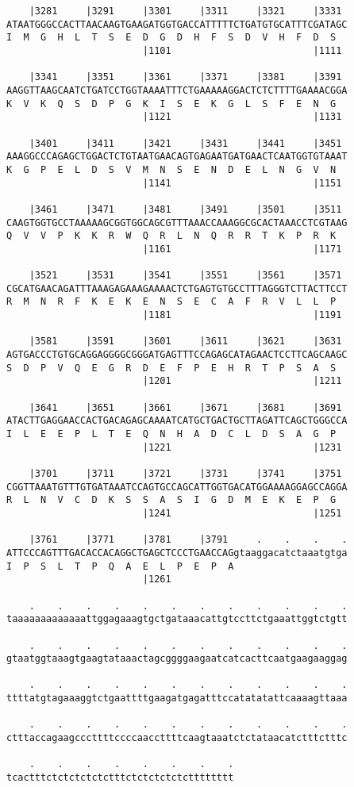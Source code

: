 \documentclass{article}
\begin{document}
\begin{Verbatim}
    |3281     |3291     |3301     |3311     |3321     |3331 
ATAATGGGCCACTTAACAAGTGAAGATGGTGACCATTTTTCTGATGTGCATTTCGATAGC
I  M  G  H  L  T  S  E  D  G  D  H  F  S  D  V  H  F  D  S  
                        |1101                         |1111 
  
    |3341     |3351     |3361     |3371     |3381     |3391 
AAGGTTAAGCAATCTGATCCTGGTAAAATTTCTGAAAAAGGACTCTCTTTTGAAAACGGA
K  V  K  Q  S  D  P  G  K  I  S  E  K  G  L  S  F  E  N  G  
                        |1121                         |1131 
  
    |3401     |3411     |3421     |3431     |3441     |3451 
AAAGGCCCAGAGCTGGACTCTGTAATGAACAGTGAGAATGATGAACTCAATGGTGTAAAT
K  G  P  E  L  D  S  V  M  N  S  E  N  D  E  L  N  G  V  N  
                        |1141                         |1151 
  
    |3461     |3471     |3481     |3491     |3501     |3511 
CAAGTGGTGCCTAAAAAGCGGTGGCAGCGTTTAAACCAAAGGCGCACTAAACCTCGTAAG
Q  V  V  P  K  K  R  W  Q  R  L  N  Q  R  R  T  K  P  R  K  
                        |1161                         |1171 
  
    |3521     |3531     |3541     |3551     |3561     |3571 
CGCATGAACAGATTTAAAGAGAAAGAAAACTCTGAGTGTGCCTTTAGGGTCTTACTTCCT
R  M  N  R  F  K  E  K  E  N  S  E  C  A  F  R  V  L  L  P  
                        |1181                         |1191 
  
    |3581     |3591     |3601     |3611     |3621     |3631 
AGTGACCCTGTGCAGGAGGGGCGGGATGAGTTTCCAGAGCATAGAACTCCTTCAGCAAGC
S  D  P  V  Q  E  G  R  D  E  F  P  E  H  R  T  P  S  A  S  
                        |1201                         |1211 
  
    |3641     |3651     |3661     |3671     |3681     |3691 
ATACTTGAGGAACCACTGACAGAGCAAAATCATGCTGACTGCTTAGATTCAGCTGGGCCA
I  L  E  E  P  L  T  E  Q  N  H  A  D  C  L  D  S  A  G  P  
                        |1221                         |1231 
  
    |3701     |3711     |3721     |3731     |3741     |3751 
CGGTTAAATGTTTGTGATAAATCCAGTGCCAGCATTGGTGACATGGAAAAGGAGCCAGGA
R  L  N  V  C  D  K  S  S  A  S  I  G  D  M  E  K  E  P  G  
                        |1241                         |1251 
  
    |3761     |3771     |3781     |3791     .    .    .    .
ATTCCCAGTTTGACACCACAGGCTGAGCTCCCTGAACCAGgtaaggacatctaaatgtga
I  P  S  L  T  P  Q  A  E  L  P  E  P  A                    
                        |1261                               
  
    .    .    .    .    .    .    .    .    .    .    .    .
taaaaaaaaaaaaattggagaaagtgctgataaacattgtccttctgaaattggtctgtt
  
    .    .    .    .    .    .    .    .    .    .    .    .
gtaatggtaaagtgaagtataaactagcggggaagaatcatcacttcaatgaagaaggag
  
    .    .    .    .    .    .    .    .    .    .    .    .
ttttatgtagaaaggtctgaattttgaagatgagatttccatatatattcaaaagttaaa
  
    .    .    .    .    .    .    .    .    .    .    .    .
ctttaccagaagcccttttccccaaccttttcaagtaaatctctataacatctttctttc
  
    .    .    .    .    .    .    .    .
tcactttctctctctctctttctctctctctctttttttt
\end{Verbatim}
\end{document}
